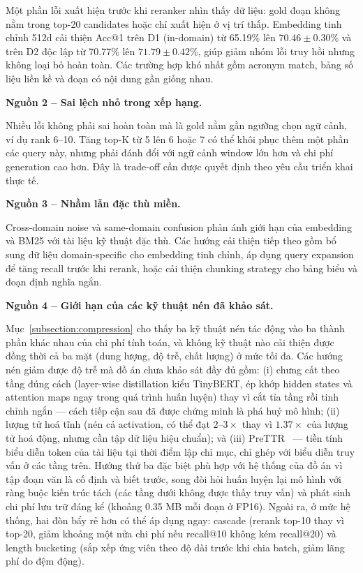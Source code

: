 \documentclass[../DoAn.tex]{subfiles}
\begin{document}
Một phần lỗi xuất hiện trước khi reranker nhìn thấy dữ liệu: gold đoạn không nằm trong top-20 candidates hoặc chỉ xuất hiện ở vị trí thấp. Embedding tinh chỉnh 512d cải thiện Acc@1 trên D1 (in-domain) từ 65.19\% lên $70.46 \pm 0.30$\% và trên D2 độc lập từ 70.77\% lên $71.79 \pm 0.42$\%, giúp giảm nhóm lỗi truy hồi nhưng không loại bỏ hoàn toàn. Các trường hợp khó nhất gồm acronym match, bảng số liệu liền kề và đoạn có nội dung gần giống nhau.

\noindent\textbf{Nguồn 2 -- Sai lệch nhỏ trong xếp hạng.}

Nhiều lỗi không phải sai hoàn toàn mà là gold nằm gần ngưỡng chọn ngữ cảnh, ví dụ rank 6--10. Tăng top-K từ 5 lên 6 hoặc 7 có thể khôi phục thêm một phần các query này, nhưng phải đánh đổi với ngữ cảnh window lớn hơn và chi phí generation cao hơn. Đây là trade-off cần được quyết định theo yêu cầu triển khai thực tế.

\noindent\textbf{Nguồn 3 -- Nhầm lẫn đặc thù miền.}

Cross-domain noise và same-domain confusion phản ánh giới hạn của embedding và BM25 với tài liệu kỹ thuật đặc thù. Các hướng cải thiện tiếp theo gồm bổ sung dữ liệu domain-specific cho embedding tinh chỉnh, áp dụng query expansion để tăng recall trước khi rerank, hoặc cải thiện chunking strategy cho bảng biểu và đoạn định nghĩa ngắn.

\noindent\textbf{Nguồn 4 -- Giới hạn của các kỹ thuật nén đã khảo sát.}

Mục~\ref{subsection:compression} cho thấy ba kỹ thuật nén tác động vào ba thành phần khác nhau của chi phí tính toán, và không kỹ thuật nào cải thiện được đồng thời cả ba mặt (dung lượng, độ trễ, chất lượng) ở mức tối đa. Các hướng nén giảm được độ trễ mà đồ án chưa khảo sát đầy đủ gồm: (i) chưng cất theo tầng đúng cách (layer-wise distillation kiểu TinyBERT, ép khớp hidden states và attention maps ngay trong quá trình huấn luyện) thay vì cắt tỉa tầng rồi tinh chỉnh ngắn --- cách tiếp cận sau đã được chứng minh là phá huỷ mô hình; (ii) lượng tử hoá tĩnh (nén cả activation, có thể đạt $2$--$3\times$ thay vì $1.37\times$ của lượng tử hoá động, nhưng cần tập dữ liệu hiệu chuẩn); và (iii) PreTTR~\cite{prettr} --- tiền tính biểu diễn token của tài liệu tại thời điểm lập chỉ mục, chỉ ghép với biểu diễn truy vấn ở các tầng trên. Hướng thứ ba đặc biệt phù hợp với hệ thống của đồ án vì tập đoạn văn là cố định và biết trước, song đòi hỏi huấn luyện lại mô hình với ràng buộc kiến trúc tách (các tầng dưới không được thấy truy vấn) và phát sinh chi phí lưu trữ đáng kể (khoảng 0.35 MB mỗi đoạn ở FP16). Ngoài ra, ở mức hệ thống, hai đòn bẩy rẻ hơn có thể áp dụng ngay: cascade (rerank top-10 thay vì top-20, giảm khoảng một nửa chi phí nếu recall@10 không kém recall@20) và length bucketing (sắp xếp ứng viên theo độ dài trước khi chia batch, giảm lãng phí do đệm động).
\end{document}
